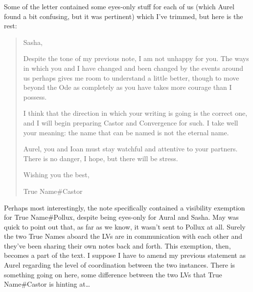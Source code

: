 Some of the letter contained some eyes-only stuff for each of us (which Aurel found a bit confusing, but it was pertinent) which I've trimmed, but here is the rest:

\begin{quote}
Sasha,

Despite the tone of my previous note, I am not unhappy for you. The ways in which you and I have changed and been changed by the events around us perhaps gives me room to understand a little better, though to move beyond the Ode as completely as you have takes more courage than I possess.

I think that the direction in which your writing is going is the correct one, and I will begin preparing Castor and Convergence for such. I take well your meaning: the name that can be named is not the eternal name.

Aurel, you and Ioan must stay watchful and attentive to your partners. There is no danger, I hope, but there will be stress.

Wishing you the best,

True Name\#Castor
\end{quote}

Perhaps most interestingly, the note specifically contained a visibility exemption for True Name\#Pollux, despite being eyes-only for Aural and Sasha. May was quick to point out that, as far as we know, it wasn't sent to Pollux at all. Surely the two True Names aboard the LVs are in communication with each other and they've been sharing their own notes back and forth. This exemption, then, becomes a part of the text. I suppose I have to amend my previous statement as Aurel regarding the level of coordination between the two instances. There is something going on here, some difference between the two LVs that True Name\#Castor is hinting at\ldots{}
